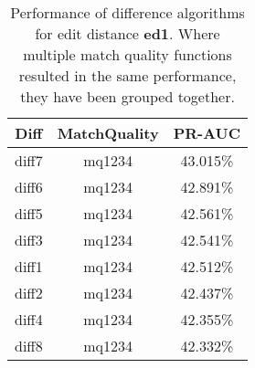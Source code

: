 \begin{table}[tbph]
\begin{center}
\begin{tabular}{|c|c||c|}
\hline
Diff & MatchQuality & PR-AUC  \\
\hline
\hline
diff7 & mq1234 & 43.015\% \\
diff6 & mq1234 & 42.891\% \\
diff5 & mq1234 & 42.561\% \\
diff3 & mq1234 & 42.541\% \\
diff1 & mq1234 & 42.512\% \\
diff2 & mq1234 & 42.437\% \\
diff4 & mq1234 & 42.355\% \\
diff8 & mq1234 & 42.332\% \\
\hline
\end{tabular}
\end{center}
\caption{Performance of difference algorithms for
  edit distance \textbf{ed1}.  Where multiple match
  quality functions resulted in the same performance, they
  have been grouped together.}
\label{tab:editlongbyed1}
\end{table}
